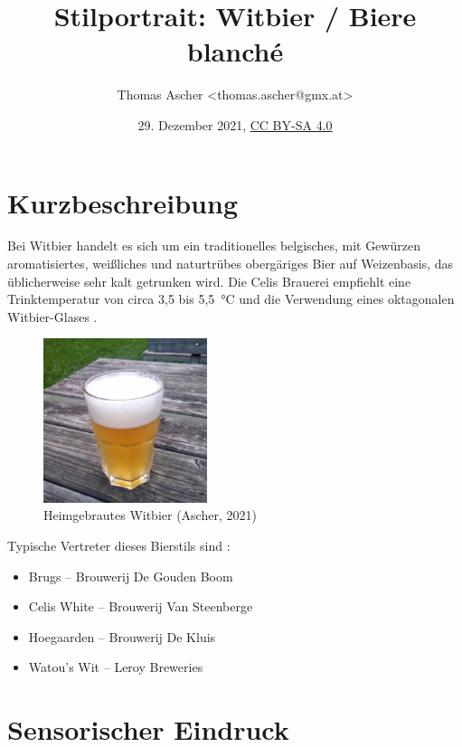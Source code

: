 \documentclass[a4paper,parskip=half]{scrartcl}
\title{Stilportrait: Witbier / Biere blanché}
\author{Thomas Ascher <thomas.ascher@gmx.at>}
\date{29. Dezember 2021, \href{http://creativecommons.org/licenses/by-sa/4.0/}{CC BY-SA 4.0}}
\begin{document}
\maketitle

\section*{Kurzbeschreibung}

Bei Witbier handelt es sich um ein traditionelles belgisches, mit Gewürzen
aromatisiertes, weißliches und naturtrübes obergäriges Bier auf Weizenbasis, das
üblicherweise sehr kalt getrunken wird. \parencite[1\psq]{Strottner1999}
Die Celis Brauerei empfiehlt eine Trinktemperatur von circa 3,5 bis 5,5~°C
und die Verwendung eines oktagonalen Witbier-Glases \parencite{CelisBrewery2021}.

\begin{multicols}{2}
\begin{figure}[H]
\centering
\includegraphics[width=4.8cm]{images/witbier.jpg}
\caption{Heimgebrautes Witbier (Ascher, 2021)}
\label{fig:witbier}
\end{figure}

\vfill\null
\columnbreak

Typische Vertreter dieses Bierstils sind \parencite[96-121]{Roncoroni2018}:

\begin{itemize}
\item Brugs – Brouwerij De Gouden Boom
\item Celis White – Brouwerij Van Steenberge
\item Hoegaarden – Brouwerij De Kluis
\item Watou's Wit – Leroy Breweries
\end{itemize}

\vfill\null
\end{multicols}

\vspace{-1.5cm}

\section*{Sensorischer Eindruck}
\end{document}
